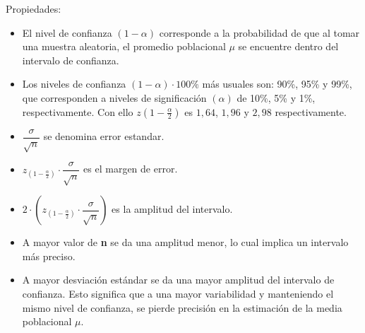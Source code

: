 \documentclass[letterpaper,11pt]{article} %
\begin{document}
\begin{itemize}
Propiedades:

\begin{itemize}
\item El nivel de confianza $(1-\alpha)$ corresponde a la probabilidad de que al tomar una muestra aleatoria, el promedio poblacional $\mu$ se encuentre dentro del intervalo de confianza.
\item Los niveles de confianza $(1-\alpha)\cdot 100\%$ más usuales son: 90\%, 95\% y 99\%, que corresponden a niveles de significación $(\alpha)$ de 10\%, 5\% y 1\%, respectivamente. Con ello $z\left(1-\frac{\alpha}{2}\right)$ es $1,64$, $1,96$ y $2,98$ respectivamente.
\item $\dfrac{\sigma}{\sqrt{n}}$ se denomina error estandar.
\item $z_{\left(1-\frac{\alpha}{2}\right)} \cdot \dfrac{\sigma}{\sqrt{n}}$ es el margen de error.
\item $2 \cdot \left(z_{\left(1-\frac{\alpha}{2}\right)} \cdot \dfrac{\sigma}{\sqrt{n}}\right)$ es la amplitud del intervalo.
\item A mayor valor de \textbf{n} se da una amplitud menor, lo cual implica un intervalo más preciso.
\item A mayor desviación estándar se da una mayor amplitud del intervalo de confianza. Esto significa que a una mayor variabilidad y manteniendo el mismo nivel de
confianza, se pierde precisión en la estimación de la media poblacional $\mu$.
\end{itemize}

\end{itemize}
\end{document}
